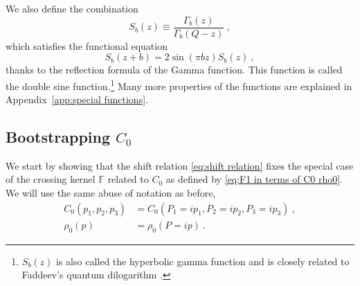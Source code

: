 \documentclass[12pt,a4paper]{article}
\newcommand{\be}{\begin{equation}}
\newcommand{\ee}{\end{equation}}
\begin{document}
We also define the combination
\be 
S_b(z)\equiv \frac{\Gamma_b(z)}{\Gamma_b(Q-z)}\ , \label{eq:Sb definition}
\ee
which satisfies the functional equation
\be 
    S_b(z+b)=2 \sin(\pi b z) S_b(z)\ ,
\ee
thanks to the reflection formula of the Gamma function.
This function is called the double sine function.\footnote{$S_b(z)$ is also called the hyperbolic gamma function and is closely related to Faddeev's quantum dilogarithm \cite{Faddeev:1995nb}.} Many more properties of the functions are explained in Appendix~\ref{app:special functions}.

\subsection{Bootstrapping \texorpdfstring{$C_0$}{C0}}\label{subsec:C0 bootstrap}
We start by showing that the shift relation \eqref{eq:shift relation} fixes the special case of the crossing kernel $\mathbb{F}$ related to $C_0$ as defined by \eqref{eq:F1 in terms of C0 rho0}. We will use the same abuse of notation as before,
\begin{align} 
C_0(p_1,p_2,p_3)&=C_0(P_1=i p_1,P_2=i p_2,P_3=i p_3)\ , \\
\rho_0(p) &= \rho_0(P=i p)\ .
\end{align}
\end{document}
